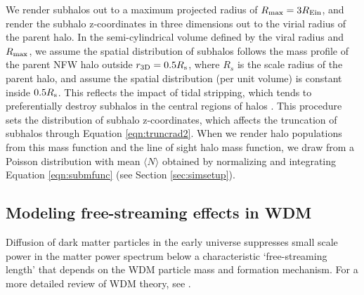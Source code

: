 We render subhalos out to a maximum projected radius of $R_{\rm{max}} = 3 R_{\rm{Ein}}$, and render the subhalo z-coordinates in three dimensions out to the virial radius of the parent halo. In the semi-cylindrical volume defined by the viral radius and $R_{\rm{max}}$, we assume the spatial distribution of subhalos follows the mass profile of the parent NFW halo outside $r_{\rm{3D}} = 0.5 R_{\rm{s}}$, where $R_s$ is the scale radius of the parent halo, and assume the spatial distribution (per unit volume) is constant inside $0.5 R_{\rm{s}}$. This reflects the impact of tidal stripping, which tends to preferentially destroy subhalos in the central regions of halos \citep{JiangvdB17}. This procedure sets the distribution of subhalo z-coordinates, which affects the truncation of subhalos through Equation \ref{eqn:truncrad2}. When we render halo populations from this mass function and the line of sight halo mass function, we draw from a Poisson distribution with mean $\langle N \rangle$ obtained by normalizing and integrating Equation \ref{eqn:submfunc} (see Section \ref{sec:simsetup}).

\subsection{Modeling free-streaming effects in WDM}
\label{ssec:wdmmodel}

Diffusion of dark matter particles in the early universe suppresses small scale power in the matter power spectrum below a characteristic `free-streaming length' that depends on the WDM particle mass and formation mechanism. For a more detailed review of WDM theory, see \citet{Benson++13,Schneider++13}.

